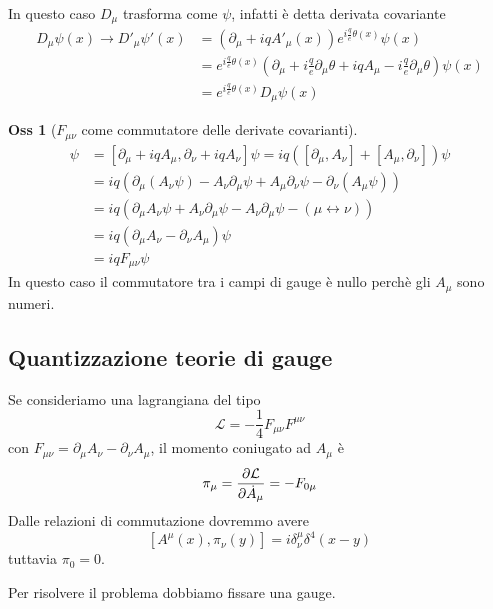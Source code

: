 \documentclass[10pt,a4paper]{article}
\theoremstyle{definition}
\newtheorem{observation}{Oss}[section]
\newcommand{\lagr}{\mathcal{L}} %
\begin{document}
In questo caso $D_\mu$ trasforma come $\psi$, infatti è detta derivata covariante
\begin{align*}
    D_\mu\psi(x) \to D'_\mu\psi'(x) &= \left(\partial_\mu + iqA'_\mu(x)\right)e^{i\frac{q}{e}\theta(x)}\psi(x) \\
    &= e^{i\frac{q}{e}\theta(x)}\left(\partial_\mu + i\frac{q}{e}\partial_\mu\theta + iqA_\mu - i\frac{q}{e}\partial_\mu\theta\right)\psi(x) \\
    &= e^{i\frac{q}{e}\theta(x)}D_\mu\psi(x)    
\end{align*}

\begin{observation}[$F_{\mu \nu}$ come commutatore delle derivate covarianti]
    \begin{align*}
        [D_\mu, D_\nu]\psi &= [\partial_\mu + iqA_\mu, \partial_\nu + iqA_\nu]\psi = iq([\partial_\mu, A_\nu] + [A_\mu, \partial_\nu])\psi \\
        &= iq \left(\partial_\mu(A_\nu \psi) - A_\nu\partial_\mu\psi + A_\mu\partial_\nu\psi - \partial_\nu(A_\mu\psi)\right) \\
        &= iq (\partial_\mu A_\nu \psi + A_\nu \partial_\mu \psi - A_\nu\partial_\mu\psi - (\mu \leftrightarrow \nu )) \\
        &= iq (\partial_\mu A_\nu - \partial_\nu A_\mu)\psi \\
        &= iq F_{\mu \nu}\psi
    \end{align*}
In questo caso il commutatore tra i campi di gauge è nullo perchè gli $A_\mu$ sono numeri.
\end{observation}

\subsection{Quantizzazione teorie di gauge}
Se consideriamo una lagrangiana del tipo
\[
\lagr = -\frac14 F_{\mu\nu}F^{\mu\nu}    
\]
con $F_{\mu\nu} = \partial_\mu A_\nu - \partial_\nu A_\mu$, il momento coniugato ad $A_\mu$ è 
\[
\pi_\mu = \pdv{\lagr}{\dot{A}_\mu} = -F_{0\mu}    
\]
Dalle relazioni di commutazione dovremmo avere 
\[
[A^{\mu}(x), \pi_\nu(y)] = i\delta^\mu_\nu \delta^4(x - y)    
\]
tuttavia $\pi_0 = 0$.

Per risolvere il problema dobbiamo fissare una gauge.
\end{document}
